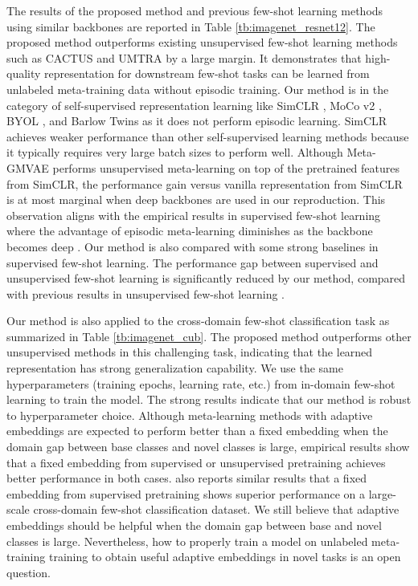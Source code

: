 \documentclass{article}
\renewcommand{\cite}{\citep}
\begin{document}
The results of the proposed method and previous few-shot learning methods using similar backbones are reported in Table \ref{tb:imagenet_resnet12}. The proposed method outperforms existing unsupervised few-shot learning methods such as CACTUS \citep{hsu:etal:2019unsupervised} and UMTRA \citep{khodadadeh:etal:2019unsupervised} by a large margin. It demonstrates that high-quality representation for downstream few-shot tasks can be learned from unlabeled meta-training data without episodic training. Our method is in the category of self-supervised representation learning like SimCLR \citep{chen:etal:2020simclr}, MoCo v2 \citep{he:etal:2020moco}, BYOL \citep{grill:etal:2020byol}, and Barlow Twins \citep{Zbontar:etal:2021barlow} as it does not perform episodic learning. SimCLR achieves weaker performance than other self-supervised learning methods because it typically requires very large batch sizes to perform well. Although Meta-GMVAE \citep{lee:etal:2021metagmvae} performs unsupervised meta-learning on top of the pretrained features from SimCLR, the performance gain versus vanilla representation from SimCLR is at most marginal when deep backbones are used in our reproduction. This observation aligns with the empirical results in supervised few-shot learning where the advantage of episodic meta-learning diminishes as the backbone becomes deep \citep{chen:etal:2019,tian:etal:2020rethinking}. Our method is also compared with some strong baselines in supervised few-shot learning. The performance gap between supervised and unsupervised few-shot learning is significantly reduced by our method, compared with previous results in unsupervised few-shot learning \citep{hsu:etal:2019unsupervised,khodadadeh:etal:2019unsupervised,lee:etal:2021metagmvae}.
  
Our method is also applied to the cross-domain few-shot classification task as summarized in Table \ref{tb:imagenet_cub}. The proposed method outperforms other unsupervised methods in this challenging task, indicating that the learned representation has strong generalization capability. We use the same hyperparameters (training epochs, learning rate, etc.) from in-domain few-shot learning to train the model.  The strong results indicate that our method is robust to hyperparameter choice. Although meta-learning methods with adaptive embeddings are expected to perform better than a fixed embedding when the domain gap between base classes and novel classes is large, empirical results show that a fixed embedding from supervised or unsupervised pretraining achieves better performance in both cases. \cite{tian:etal:2020rethinking} also reports similar results that a fixed embedding from supervised pretraining shows superior performance on a large-scale cross-domain few-shot classification dataset. We still believe that adaptive embeddings should be helpful when the domain gap between base and novel classes is large. Nevertheless, how to properly train a model on unlabeled meta-training training to obtain useful adaptive embeddings in novel tasks is an open question.
\end{document}
